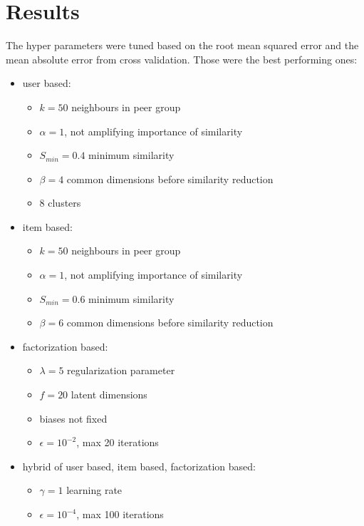 \documentclass[11pt]{scrartcl}
\begin{document}
\section{Results}
The hyper parameters were tuned based on the root mean squared error and the mean absolute error from cross validation.
Those were the best performing ones:
\begin{itemize}
	\item user based: \begin{itemize}
		      \item $k = 50$ neighbours in peer group
		      \item $\alpha = 1$, not amplifying importance of similarity
		      \item $S_{min} = 0.4$ minimum similarity
		      \item $\beta = 4$ common dimensions before similarity reduction
		      \item 8 clusters
	      \end{itemize}
	\item item based: \begin{itemize}
		      \item $k = 50$ neighbours in peer group
		      \item $\alpha = 1$, not amplifying importance of similarity
		      \item $S_{min} = 0.6$ minimum similarity
		      \item $\beta = 6$ common dimensions before similarity reduction
	      \end{itemize}
	\item factorization based: \begin{itemize}
		      \item $\lambda = 5$ regularization parameter
		      \item $f = 20$ latent dimensions
		      \item biases not fixed
		      \item $\epsilon = 10^{-2}$, max 20 iterations
	      \end{itemize}
	\item hybrid of user based, item based, factorization based: \begin{itemize}
		      \item $\gamma = 1$ learning rate
		      \item $\epsilon = 10^{-4}$, max 100 iterations
	      \end{itemize}
\end{itemize}
\end{document}

